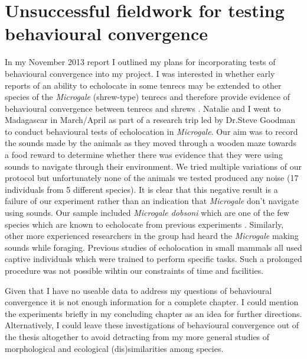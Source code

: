 \documentclass[12pt,a4paper]{article}
\begin{document}
\section{Unsuccessful fieldwork for testing behavioural convergence}

In my November 2013 report I outlined my plans for incorporating tests of behavioural convergence into my project. I was interested in whether early reports of an ability to echolocate in some tenrecs \citep{Gould1965} may be extended to other species of the \textit{Microgale} (shrew-type) tenrecs and therefore provide evidence of behavioural convergence between tenrecs and shrews \citep{Siemers2009}. Natalie and I went to Madagascar in March/April as part of a research trip led by Dr.Steve Goodman to conduct behavioural tests of echolocation in \textit{Microgale}. Our aim was to record the sounds made by the animals as they moved through a wooden maze towards a food reward to determine whether there was evidence that they were using sounds to navigate through their environment. We tried multiple variations of our protocol but unfortunately none of the animals we tested produced any noise (17 individuals from 5 different species). It is clear that this negative result is a failure of our experiment rather than an indication that \textit{Microgale} don't navigate using sounds. Our sample included \textit{Microgale dobsoni} which are one of the few species which are known to echolocate from previous experiments \citep{Gould1965}. Similarly, other more experienced researchers in the group had heard the \textit{Microgale} making sounds while foraging. Previous studies of echolocation in small mammals \citep{Gould1964, Gould1965, Tomasi1979, Siemers2009} all used captive individuals which were trained to perform specific tasks. Such a prolonged procedure was not possible wihtin our constraints of time and facilities.

Given that I have no useable data to address my questions of behavioural convergence it is not enough information for a complete chapter. I could mention the experiments briefly in my concluding chapter as an idea for further directions. Alternatively, I could leave these investigations of behavioural convergence out of the thesis altogether to avoid detracting from my more general studies of morphological and ecological (dis)similarities among species.
\end{document}
